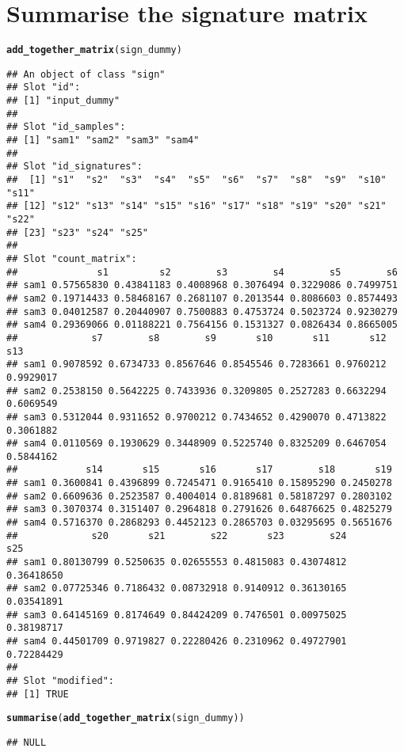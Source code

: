 \documentclass{article}\usepackage[]{graphicx}\usepackage[]{color}
\makeatletter
\newcommand{\hlstd}[1]{\textcolor[rgb]{0.345,0.345,0.345}{#1}}%
\newcommand{\hlkwd}[1]{\textcolor[rgb]{0.737,0.353,0.396}{\textbf{#1}}}%
\newenvironment{kframe}{%
 \def\at@end@of@kframe{}%
 \ifinner\ifhmode%
  \def\at@end@of@kframe{\end{minipage}}%
  \begin{minipage}{\columnwidth}%
 \fi\fi%
 \def\FrameCommand##1{\hskip\@totalleftmargin \hskip-\fboxsep
 \colorbox{shadecolor}{##1}\hskip-\fboxsep
     \hskip-\linewidth \hskip-\@totalleftmargin \hskip\columnwidth}%
 \MakeFramed {\advance\hsize-\width
   \@totalleftmargin\z@ \linewidth\hsize
   \@setminipage}}%
 {\par\unskip\endMakeFramed%
 \at@end@of@kframe}
\newenvironment{knitrout}{}{} %
\makeatother
\begin{document}
\section{Summarise the signature matrix}
\begin{knitrout}
\color{fgcolor}\begin{kframe}
\begin{alltt}
\hlkwd{add_together_matrix}\hlstd{(sign_dummy)}
\end{alltt}
\begin{verbatim}
## An object of class "sign"
## Slot "id":
## [1] "input_dummy"
## 
## Slot "id_samples":
## [1] "sam1" "sam2" "sam3" "sam4"
## 
## Slot "id_signatures":
##  [1] "s1"  "s2"  "s3"  "s4"  "s5"  "s6"  "s7"  "s8"  "s9"  "s10" "s11"
## [12] "s12" "s13" "s14" "s15" "s16" "s17" "s18" "s19" "s20" "s21" "s22"
## [23] "s23" "s24" "s25"
## 
## Slot "count_matrix":
##              s1         s2        s3        s4        s5        s6
## sam1 0.57565830 0.43841183 0.4008968 0.3076494 0.3229086 0.7499751
## sam2 0.19714433 0.58468167 0.2681107 0.2013544 0.8086603 0.8574493
## sam3 0.04012587 0.20440907 0.7500883 0.4753724 0.5023724 0.9230279
## sam4 0.29369066 0.01188221 0.7564156 0.1531327 0.0826434 0.8665005
##             s7        s8        s9       s10       s11       s12       s13
## sam1 0.9078592 0.6734733 0.8567646 0.8545546 0.7283661 0.9760212 0.9929017
## sam2 0.2538150 0.5642225 0.7433936 0.3209805 0.2527283 0.6632294 0.6069549
## sam3 0.5312044 0.9311652 0.9700212 0.7434652 0.4290070 0.4713822 0.3061882
## sam4 0.0110569 0.1930629 0.3448909 0.5225740 0.8325209 0.6467054 0.5844162
##            s14       s15       s16       s17        s18       s19
## sam1 0.3600841 0.4396899 0.7245471 0.9165410 0.15895290 0.2450278
## sam2 0.6609636 0.2523587 0.4004014 0.8189681 0.58187297 0.2803102
## sam3 0.3070374 0.3151407 0.2964818 0.2791626 0.64876625 0.4825279
## sam4 0.5716370 0.2868293 0.4452123 0.2865703 0.03295695 0.5651676
##             s20       s21        s22       s23        s24        s25
## sam1 0.80130799 0.5250635 0.02655553 0.4815083 0.43074812 0.36418650
## sam2 0.07725346 0.7186432 0.08732918 0.9140912 0.36130165 0.03541891
## sam3 0.64145169 0.8174649 0.84424209 0.7476501 0.00975025 0.38198717
## sam4 0.44501709 0.9719827 0.22280426 0.2310962 0.49727901 0.72284429
## 
## Slot "modified":
## [1] TRUE
\end{verbatim}
\begin{alltt}
\hlkwd{summarise}\hlstd{(}\hlkwd{add_together_matrix}\hlstd{(sign_dummy))}
\end{alltt}
\begin{verbatim}
## NULL
\end{verbatim}
\end{kframe}
\end{knitrout}
\end{document}
